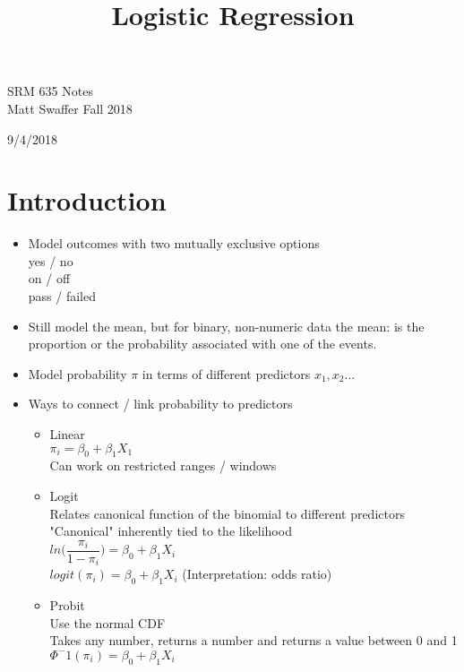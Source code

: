 \documentclass[12 pt]{article}
\begin{document}
\begin{center}
	SRM 635 Notes\\
	\color{blue}
	Matt Swaffer Fall 2018
	\color{black}
\end{center}

\begin{center}
    9/4/2018
\title{Logistic Regression}
\end{center}
\section{Introduction}
\begin{itemize}
    \item Model outcomes with two mutually exclusive options \\
          yes / no \\
          on / off \\
          pass / failed 
    \item Still model the mean, but for binary, non-numeric data the mean: is the proportion or the probability associated with one of the events. 
    \item Model probability \( \pi \) in terms of different predictors \( x_1, x_2 ... \)
    \item Ways to connect / link probability to predictors\\
        \begin{itemize}
            \item Linear\\
                $ \pi_i = \beta_0 + \beta_1 X_1 $ \\
                Can work on restricted ranges / windows
            \item Logit\\
                Relates canonical function of the binomial to different predictors\\
                "Canonical" inherently tied to the likelihood\\
                $ ln \Big(\dfrac{\pi_i}{1-\pi_i} \Big) = \beta_0 + \beta_1 X_i  $\\
                $ logit(\pi_i) = \beta_0 + \beta_1 X_i  $
                (Interpretation: odds ratio)
            \item Probit\\
                Use the normal CDF \\
                Takes any number, returns a number and returns a value between 0 and 1\\
                $\Phi^-1(\pi_i) = \beta_0 + \beta_1 X_i$\\

\end{itemize}
\end{itemize}
\end{document}
